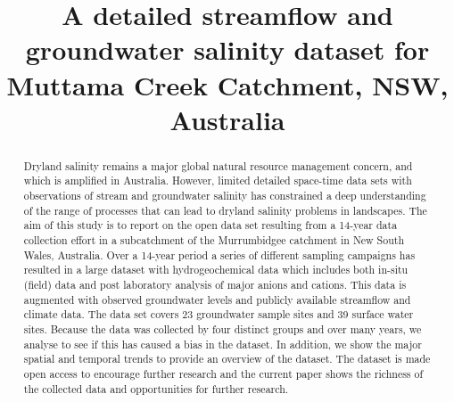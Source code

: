 \documentclass[, manuscript]{copernicus}
\begin{document}
\title{A detailed streamflow and groundwater salinity dataset for
Muttama Creek Catchment, NSW, Australia}











\received{}
\pubdiscuss{} %
\revised{}
\accepted{}
\published{}




\maketitle


\begin{abstract}
Dryland salinity remains a major global natural resource management
concern, and which is amplified in Australia. However, limited detailed
space-time data sets with observations of stream and groundwater
salinity has constrained a deep understanding of the range of processes
that can lead to dryland salinity problems in landscapes. The aim of
this study is to report on the open data set resulting from a 14-year
data collection effort in a subcatchment of the Murrumbidgee catchment
in New South Wales, Australia. Over a 14-year period a series of
different sampling campaigns has resulted in a large dataset with
hydrogeochemical data which includes both in-situ (field) data and post
laboratory analysis of major anions and cations. This data is augmented
with observed groundwater levels and publicly available streamflow and
climate data. The data set covers 23 groundwater sample sites and 39
surface water sites. Because the data was collected by four distinct
groups and over many years, we analyse to see if this has caused a bias
in the dataset. In addition, we show the major spatial and temporal
trends to provide an overview of the dataset. The dataset is made open
access to encourage further research and the current paper shows the
richness of the collected data and opportunities for further research.
\end{abstract}
\end{document}
